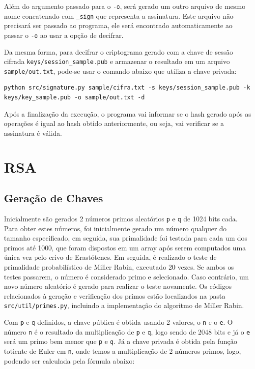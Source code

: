 \documentclass[12pt]{article}
\begin{document}
Além do argumento passado para o \texttt{-o}, será gerado um outro arquivo de mesmo nome concatenado com \texttt{\_sign} que representa a assinatura. Este arquivo não precisará ser passado ao programa, ele será encontrado automaticamente ao passar o \texttt{-o} ao usar a opção de decifrar.

Da mesma forma, para decifrar o criptograma gerado com a chave de sessão cifrada \texttt{keys/session\_sample.pub} e armazenar o resultado em um arquivo \texttt{sample/out.txt}, pode-se usar o comando abaixo que utiliza a chave privada:

\begin{lstlisting}
python src/signature.py sample/cifra.txt -s keys/session_sample.pub -k keys/key_sample.pub -o sample/out.txt -d
\end{lstlisting}

Após a finalização da execução, o programa vai informar se o hash gerado após as operações é igual ao hash obtido anteriormente, ou seja, vai verificar se a assinatura é válida.

\section{RSA}
\subsection{Geração de Chaves}

Inicialmente são gerados 2 números primos aleatórios \texttt{p} e \texttt{q} de 1024 bits cada. Para obter estes números, foi inicialmente gerado um número qualquer do tamanho especificado, em seguida, sua primalidade foi testada para cada um dos primos até 1000, que foram dispostos em um array após serem computados uma única vez pelo crivo de Erastótenes. Em seguida, é realizado o teste de primalidade probabilístico de Miller Rabin, executado 20 vezes. Se ambos os testes passarem, o número é considerado primo e selecionado. Caso contrário, um novo número aleatório é gerado para realizar o teste novamente. Os códigos relacionados à geração e verificação dos primos estão localizados na pasta \texttt{src/util/primes.py}, incluindo a implementação do algoritmo de Miller Rabin.

Com \texttt{p} e \texttt{q} definidos, a chave pública é obtida usando 2 valores, o \texttt{n} e o \texttt{e}. O número \texttt{n} é o resultado da multiplicação de \texttt{p} e \texttt{q}, logo sendo de 2048 bits e já o \texttt{e} será um primo bem menor que \texttt{p} e \texttt{q}. Já a chave privada é obtida pela função totiente de Euler em \texttt{n}, onde temos a multiplicação de 2 números primos, logo, podendo ser calculada pela fórmula abaixo:
\end{document}
